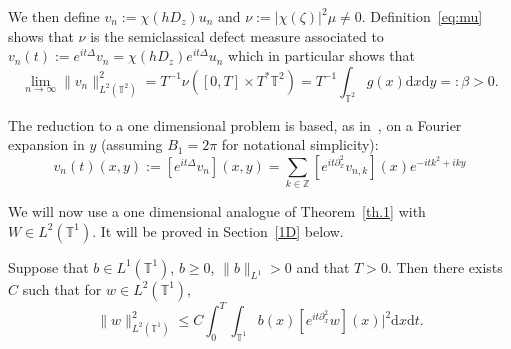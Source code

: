 \documentclass[AHL, Unicode, longabstracts]{cedram}
\newcommand{\TT}{{\mathbb T}}
\newcommand{\ZZ}{{\mathbb Z}}
\newcommand{\TT}{{\mathbb T}}
\newcommand{\ZZ}{{\mathbb Z}}
\newcommand*{\dd}{\mathrm{d}}
\newcommand*{\dx}{\dd x}
\newcommand*{\dy}{\dd y}
\newcommand*{\dt}{\dd t}
\begin{document}
We then define $ v_n := \chi (h D_z) u_n $ and $\nu := |\chi (\zeta)|^2 \mu \neq 0 $. Definition~\eqref{eq:mu} shows that $ \nu $ is the semiclassical defect measure associated to $ v_n (t) := e^{ i t \Delta } v_n = \chi (h D_z) e^{ it \Delta } u_n $ which in particular shows that
\begin{equation}\label{eq:beta}
\lim_{n\to \infty} \| v_n \|_{ L^2 (\TT^2) }^2 = T^{-1} \nu ([0, T] \times T^* \TT^2) = T^{-1} \int_{ \TT^2 } g (x) \dx \dy =: \beta > 0.
\end{equation}

The reduction to a one dimensional problem is based, as in~\cite{BZ4}, on a Fourier expansion in $ y $ (assuming $ B_1 = 2 \pi $ for notational simplicity):
\begin{equation}\label{eq:Four}
v_n (t) (x, y) := [e^{ i t \Delta } v_n] (x, y) =
\sum_{ k \in \ZZ } [e^{ i t \partial_x^2 } v_{n, k }] (x) e^{-it k^2 + i ky }
\end{equation}

We will now use a one dimensional analogue of Theorem~\ref{th.1} with $ W \in L^2 (\TT^1) $. It will be proved in Section~\ref{1D} below.
\begin{lemm}\label{l:3}
Suppose that $ b \in L^1 (\TT^1) $, $ b\geq 0 $, $\| b \|_{ L^1 } > 0 $ and that $ T > 0 $. Then there exists $ C $ such that for $ w \in L^2 (\TT^1) $,
\begin{equation}\label{eq:l3}
\| w \|_{L^2 (\TT^1) }^2 \leq C \int_0^T \int_{\TT^1} b (x) [e^{ i t \partial_x^2} w](x)|^2 \dx \dt.
\end{equation}
\end{lemm}
\end{document}
